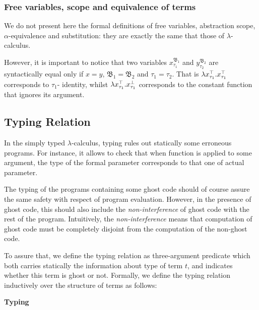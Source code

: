 \subsubsection*{Free variables, scope and equivalence of terms} 
We do not present here the formal definitions of free variables, 
abstraction scope, $\alpha$-equivalence and substitution: they are exactly 
the same that those of $\lambda$-calculus.

However, it is important to notice that two variables $x^{\mathfrak{B_{1}}}_{\tau_{1}}$ and  
$y^{\mathfrak{B_{2}}}_{\tau_{2}}$ are syntactically equal only if 
$x = y$, $\mathfrak{B_{1}} = \mathfrak{B_{2}}$ and $ \tau_{1} = \tau_{2} $. That is  $\lambda x^{\top}_{\tau_{1}}. x^{\top}_{\tau_{1}}$ corresponds to $\tau_{1}$- identity, whilst  $\lambda x^{\top}_{\tau_{1}}. x^{\bot}_{\tau_{1}}$ corresponds to the constant function that ignores its argument. 

  
\subsection{Typing Relation}
In the simply typed $\lambda$-calculus, typing rules out  statically some erroneous programs. For instance, it allows to check that when function is applied to some argument, the type of the formal parameter corresponds to that one of actual parameter.

The typing of the programs containing some ghost code should of course 
assure the same safety with respect of program evaluation. However, in the presence of ghost code, this should also include the \textit{non-interference} of ghost code with the rest of the program. Intuitively, the \textit{non-interference} means that computation of ghost code must be completely disjoint from the computation of the non-ghost code. 

To assure that, we define the typing relation as three-argument predicate  
 which both carries statically the information about type of term $t$, and indicates whether
this term is ghost or not. Formally, we define the typing relation inductively over the structure of terms as follows:
 
  	 \begin{flushright}  	 \textbf{Typing}  	 \end{flushright}
	
	
